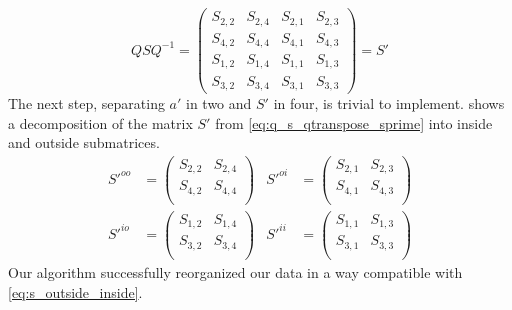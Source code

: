 \begin{equation}
    Q S Q^{-1}
    =
    \begin{pmatrix}
        S_{2,2} & S_{2,4} & S_{2,1} & S_{2,3} \\
        S_{4,2} & S_{4,4} & S_{4,1} & S_{4,3} \\
        S_{1,2} & S_{1,4} & S_{1,1} & S_{1,3} \\
        S_{3,2} & S_{3,4} & S_{3,1} & S_{3,3}
    \end{pmatrix}
    =
    S'
    \label{eq:q_s_qtranspose_sprime}
\end{equation}
The next step, separating $a'$ in two and $S'$ in four, is trivial to implement.
 shows a decomposition of the matrix $S'$ from \cref{eq:q_s_qtranspose_sprime} into inside and outside submatrices.
\begin{equation}
    \begin{aligned}
    S'^{oo}
    &=
    \begin{pmatrix}
        S_{2,2} & S_{2,4}  \\
        S_{4,2} & S_{4,4}  \\
    \end{pmatrix}
    &
    S'^{oi}
    &=
    \begin{pmatrix}
        S_{2,1} & S_{2,3}  \\
        S_{4,1} & S_{4,3}  \\
    \end{pmatrix}
    \\
    S'^{io}
    &=
    \begin{pmatrix}
        S_{1,2} & S_{1,4}  \\
        S_{3,2} & S_{3,4}  \\
    \end{pmatrix}
    &
    S'^{ii}
    &=
    \begin{pmatrix}
        S_{1,1} & S_{1,3}  \\
        S_{3,1} & S_{3,3}  \\
    \end{pmatrix}
    \end{aligned}
    \label{eq:q_s_qtranspose_sprime_decomposed}
\end{equation}
Our algorithm successfully reorganized our data in a way compatible with \cref{eq:s_outside_inside}.

